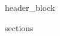 \documentclass[10pt, a4paper]{article}
\begin{document}
\justifying
\sloppy

{{header_block}}

{{sections}}
\end{document}
